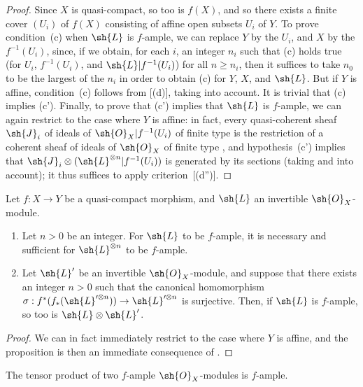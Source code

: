 \begin{proof}
Since $X$ is quasi-compact, so too is $f(X)$, and so there exists a finite cover $(U_i)$ of $f(X)$ consisting of affine open subsets $U_i$ of $Y$.
To prove condition~(c) when $\sh{L}$ is $f$-ample, we can replace $Y$ by the $U_i$, and $X$ by the $f^{-1}(U_i)$, since, if we obtain, for each $i$, an integer $n_i$ such that (c) holds true (for $U_i$, $f^{-1}(U_i)$, and $\sh{L}|f^{-1}(U_i)$) for all $n\geq n_i$, then it suffices to take $n_0$ to be the largest of the $n_i$ in order to obtain (c) for $Y$, $X$, and $\sh{L}$.
But if $Y$ is affine, condition~(c) follows from [(d)], taking  into account.
It is trivial that (c) implies (c').
Finally, to prove that (c') implies that $\sh{L}$ is $f$-ample, we can again restrict to the case where $Y$ is affine:
in fact, every quasi-coherent sheaf $\sh{J}_i$ of ideals of $\sh{O}_X|f^{-1}(U_i)$ of finite type is the restriction of a coherent sheaf of ideals of $\sh{O}_X$ of finite type , and hypothesis~(c') implies that
$\sh{J}_i\otimes(\sh{L}^{\otimes n}|f^{-1}(U_i))$ is generated by its sections (taking  and  into account);
it thus suffices to apply criterion~[(d'')].
\end{proof}

\begin{proposition}[4.6.9]
\label{II.4.6.9}
Let $f:X\to Y$ be a quasi-compact morphism, and $\sh{L}$ an invertible $\sh{O}_X$-module.
\begin{enumerate}
  \item[\rm{(i)}] Let $n>0$ be an integer.
    For $\sh{L}$ to be $f$-ample, it is necessary and sufficient for $\sh{L}^{\otimes n}$ to be $f$-ample.
  \item[\rm{(ii)}] Let $\sh{L}'$ be an invertible $\sh{O}_X$-module, and suppose that there exists an integer $n>0$ such that the canonical homomorphism $\sigma:f^*(f_*(\sh{L}'^{\otimes n}))\to\sh{L}'^{\otimes n}$ is surjective.
    Then, if $\sh{L}$ is $f$-ample, so too is $\sh{L}\otimes\sh{L}'$.
\end{enumerate}
\end{proposition}

\begin{proof}
We can in fact immediately restrict to the case where $Y$ is affine, and the proposition is then an immediate consequence of .
\end{proof}

\begin{corollary}[4.6.10]
\label{II.4.6.10}
The tensor product of two $f$-ample $\sh{O}_X$-modules is $f$-ample.
\end{corollary}

